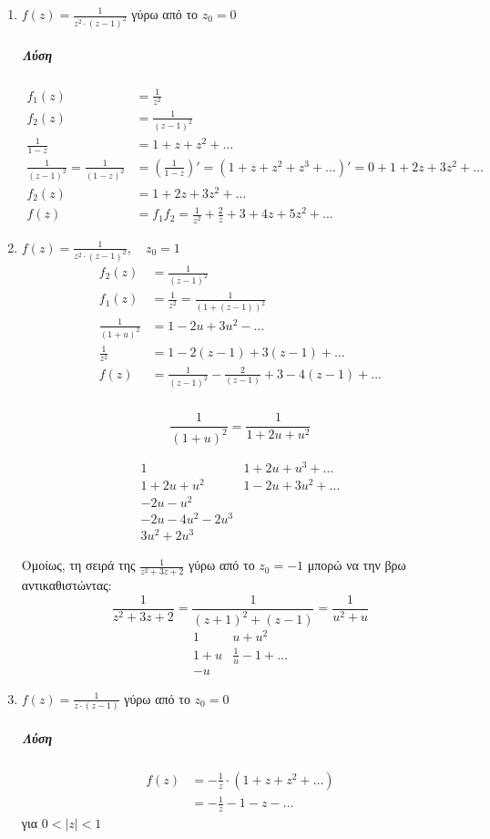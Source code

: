\documentclass[12pt,a4paper,notitlepage,fleqn]{article}
\begin{document}
\begin{enumerate}
  \item \( f(z) = \frac{1}{z^2\cdot(z-1)^2} \) γύρω από το \( z_0 = 0 \)
  \subparagraph{Λύση}
  \begin{align*}
  f_1(z) &= \frac{1}{z^2} \\
  f_2(z) &= \frac{1}{(z-1)^2} \\
  \frac{1}{1-z} &= 1 + z + z^2 + \dots \\
  \frac{1}{(z-1)^2} = \frac{1}{(1-z)^2} &= \left( \frac{1}{1-z} \right)' =
   (1+z+z^2+z^3+\dots)' =
   0+1+2z+3z^2+\dots
  \\ f_2(z) &= 1+2z+3z^2+\dots \\
  f(z) &= f_1f_2 = \frac{1}{z^2} + \frac{2}{z} + 3 + 4z + 5z^2 + \dots
  \end{align*}

  \item \( f(z) = \frac{1}{z^2\cdot(z-1)^2},\quad z_0 = 1 \)
  \begin{align*}
  f_2(z) &= \frac{1}{(z-1)^2} \\
  f_1(z) &= \frac{1}{z^2} = \frac{1}{\left(1+(z-1)\right)^2} \\
  \frac{1}{(1+u)^2} &= 1 - 2u + 3u^2 - \dots \\
  \frac{1}{z^2} &= 1-2(z-1)+3(z-1) + \dots \\
  f(z) &= \frac{1}{(z-1)^2} - \frac{2}{(z-1)} + 3 - 4(z-1) + \dots
  \end{align*}

  \subparagraph{}
  \[
  \frac{1}{(1+u)^2} = \frac{1}{1+2u+u^2}
  \]

  \[
  \begin{array}{l|l}
  1 & 1+2u+u^3 + \dots \\ \hline
  1+2u+u^2 & 1-2u+3u^2+\dots \\
  -2u-u^2 & \\ -2u-4u^2-2u^3 & \\ 3u^2+2u^3
  \end{array}
  \]

  Ομοίως, τη σειρά της \( \frac{1}{z^2+3z+2} \) γύρω από το \( z_0 = -1 \) μπορώ
  να την βρω αντικαθιστώντας:
  \[
  \frac{1}{z^2+3z+2} = \frac{1}{(z+1)^2+(z-1)} = \frac{1}{u^2+u}
  \]\[
  \begin{array}{l|l}
  1 & u+u^2 \\ \hline
  1+u & \frac{1}{u} - 1 + \dots \\
  -u &
  \end{array}
  \]

  \item \( f(z) = \frac{1}{z\cdot(z-1)} \) γύρω από το \( z_0 = 0 \)
  \subparagraph{Λύση}
  \begin{align*}
  f(z) &= -\frac{1}{z}\cdot ( 1+z+z^2+\dots) \\
  &= -\frac{1}{z} - 1 - z - \dots
  \end{align*}
  για \( 0<|z|<1 \)


\end{enumerate}
\end{document}
